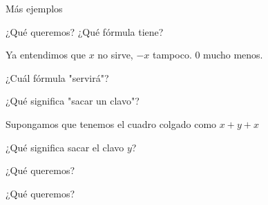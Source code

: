 \documentclass[11pt]{beamer}
\begin{document}
\begin{frame}{Más ejemplos}

\bigskip

\bigskip

\center {\textbf {  \huge{[Pizarrón]}}}








\end{frame}


\begin{frame}{¿Qué queremos? ¿Qué fórmula tiene?}

Ya entendimos que {\color{red}$x$} no sirve, {\color{red}$-x$} tampoco. {\color{red}$0$} mucho menos.


¿Cuál fórmula "servirá"?

\end{frame}


\begin{frame}{¿Qué significa "sacar un clavo"?}

Supongamos que tenemos el cuadro colgado como {\color{red}$x + y + x$}

¿Qué significa sacar el clavo $y$?

\bigskip



\end{frame}






\begin{frame}{¿Qué queremos?}

¿Qué queremos?
\bigskip



\end{frame}
\end{document}
